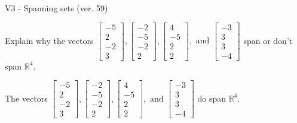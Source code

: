 \begin{exercise}
  \begin{exerciseTitle}V3 - Spanning sets (ver. 59)\end{exerciseTitle}
  \begin{exerciseStatement}
    Explain why the vectors \(\left[\begin{array}{r}
-5 \\
2 \\
-2 \\
3
\end{array}\right] , \left[\begin{array}{r}
-2 \\
-5 \\
-2 \\
2
\end{array}\right] , \left[\begin{array}{r}
4 \\
-5 \\
2 \\
2
\end{array}\right] , \text{ and } \left[\begin{array}{r}
-3 \\
3 \\
3 \\
-4
\end{array}\right]\) span or don't span \(\mathbb{R}^4\). 
	


  \end{exerciseStatement}
  \begin{exerciseAnswer}
   The vectors \(\left[\begin{array}{r}
-5 \\
2 \\
-2 \\
3
\end{array}\right] , \left[\begin{array}{r}
-2 \\
-5 \\
-2 \\
2
\end{array}\right] , \left[\begin{array}{r}
4 \\
-5 \\
2 \\
2
\end{array}\right] , \text{ and } \left[\begin{array}{r}
-3 \\
3 \\
3 \\
-4
\end{array}\right]\) 
  	 do  
	span \(\mathbb{R}^4\).
  


  \end{exerciseAnswer}
\end{exercise}